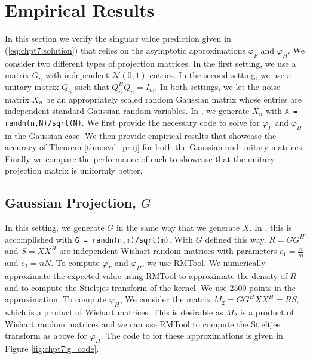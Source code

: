 \section{Empirical Results}\label{sec:chpt7:emp_res}

In this section we verify the singular value prediction given in (\ref{eq:chpt7:solution})
that relies on the asymptotic approximations $\varphi_F$ and $\varphi_H$. We consider two
different types of projection matrices. In the first setting, we use a matrix $G_n$ with
independent $\mathcal{N}(0,1)$ entries. In the second setting, we use a unitary matrix $Q_n$
such that $Q_n^HQ_n=I_m$. In both settings, we let the noise matrix $X_n$ be an appropriately
scaled random Gaussian matrix whose entries are independent standard Gaussian random
variables. In {}, we generate $X_n$ with 
\be 
\texttt{X = randn(n,N)/sqrt(N)}.
\ee
We first provide the necessary {} code to solve for $\varphi_F$ and $\varphi_H$
in the Gaussian case. We then provide empirical results that showcase the accuracy of
Theorem \ref{thm:svd_proj} for both the Gaussian and unitary matrices. Finally we compare
the performance of each to showcase that the unitary projection matrix is uniformly
better. 

\subsection{Gaussian Projection, $G$}

In this setting, we generate $G$ in the same way that we generate $X$. In {},
this is accomplished with \be \texttt{G = randn(n,m)/sqrt(m)}.  \ee With $G$ defined this
way, $R=GG^H$ and $S=XX^H$ are independent Wishart random matrices with parameters $c_1 =
\frac{n}{m}$ and $c_2={n}{N}$. To compute $\varphi_F$ and $\varphi_H$, we use RMTool. We
numerically approximate the expected value using RMTool to approximate the density of $R$ and
to compute the Stieltjes transform of the kernel. We use 2500 points in the
approximation. To compute $\varphi_H$, We consider the matrix $M_2=GG^HXX^H=RS$, which is
a product of Wishart matrices. This is desirable as $M_2$ is a product of Wishart random
matrices and we can use RMTool to compute the Stieltjes transform as above for
$\varphi_H$.  The {} code to for these approximations is given in Figure
\ref{fig:chpt7:g_code}.



